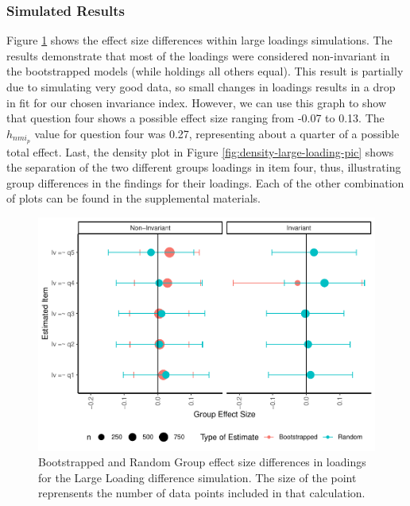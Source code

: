 \documentclass[
  man]{apa7}
\begin{document}
\hypertarget{simulated-results-2}{%
\subsubsection{Simulated Results}\label{simulated-results-2}}

Figure \ref{fig:effect-large-loading-pic} shows the effect size differences within large loadings simulations. The results demonstrate that most of the loadings were considered non-invariant in the bootstrapped models (while holdings all others equal). This result is partially due to simulating very good data, so small changes in loadings results in a drop in fit for our chosen invariance index. However, we can use this graph to show that question four shows a possible effect size ranging from -0.07 to 0.13. The \(h_{nmi_p}\) value for question four was 0.27, representing about a quarter of a possible total effect. Last, the density plot in Figure \ref{fig:density-large-loading-pic} shows the separation of the two different groups loadings in item four, thus, illustrating group differences in the findings for their loadings. Each of the other combination of plots can be found in the supplemental materials.

\begin{figure}
\centering
\includegraphics{manuscript_files/figure-latex/effect-large-loading-pic-1.pdf}
\caption{\label{fig:effect-large-loading-pic}Bootstrapped and Random Group effect size differences in loadings for the Large Loading difference simulation. The size of the point reprensents the number of data points included in that calculation.}
\end{figure}
\end{document}
